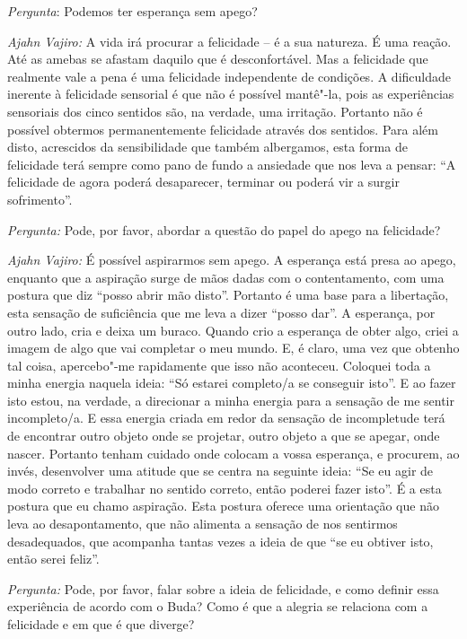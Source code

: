 \bigskip

\emph{Pergunta}: Podemos ter esperança sem apego?

\emph{Ajahn Vajiro:} A vida irá procurar a felicidade -- é a sua natureza. É uma
reação. Até as amebas se afastam daquilo que é desconfortável. Mas a felicidade
que realmente vale a pena é uma felicidade independente de condições. A
dificuldade inerente à felicidade sensorial é que não é possível mantê"-la, pois
as experiências sensoriais dos cinco sentidos são, na verdade, uma irritação.
Portanto não é possível obtermos permanentemente felicidade através dos
sentidos. Para além disto, acrescidos da sensibilidade que também albergamos,
esta forma de felicidade terá sempre como pano de fundo a ansiedade que nos leva
a pensar: ``A felicidade de agora poderá desaparecer, terminar ou poderá vir a surgir
sofrimento''.

\emph{Pergunta:} Pode, por favor, abordar a questão do papel do apego na felicidade?

\emph{Ajahn Vajiro:} É possível aspirarmos sem apego. A esperança está presa ao
apego, enquanto que a aspiração surge de mãos dadas com o contentamento, com uma
postura que diz ``posso abrir mão disto''. Portanto é uma base para a
libertação, esta sensação de suficiência que me leva a dizer ``posso dar''. A
esperança, por outro lado, cria e deixa um buraco. Quando crio a esperança de
obter algo, criei a imagem de algo que vai completar o meu mundo. E, é claro,
uma vez que obtenho tal coisa, apercebo"-me rapidamente que isso não aconteceu.
Coloquei toda a minha energia naquela ideia: ``Só estarei completo/a se
conseguir isto''. E ao fazer isto estou, na verdade, a direcionar a minha
energia para a sensação de me sentir incompleto/a. E essa energia criada em
redor da sensação de incompletude terá de encontrar outro objeto onde se
projetar, outro objeto a que se apegar, onde nascer. Portanto tenham cuidado
onde colocam a vossa esperança, e procurem, ao invés, desenvolver uma atitude que
se centra na seguinte ideia: ``Se eu agir de modo correto e trabalhar no sentido
correto, então poderei fazer isto''. É a esta postura que eu chamo aspiração.
Esta postura oferece uma orientação que não leva ao desapontamento, que não
alimenta a sensação de nos sentirmos desadequados, que acompanha tantas vezes a
ideia de que ``se eu obtiver isto, então serei feliz''.

\bigskip

\emph{Pergunta:} Pode, por favor, falar sobre a ideia de felicidade, e como
definir essa experiência de acordo com o Buda? Como é que a alegria se relaciona
com a felicidade e em que é que diverge?

